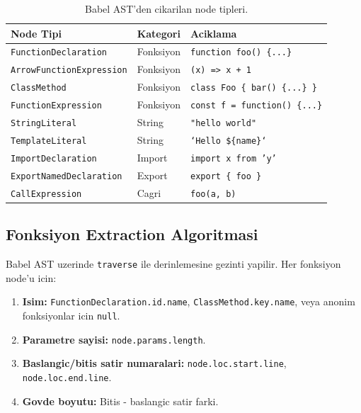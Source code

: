 \begin{table}[htbp]
\centering
\begin{tabular}{llp{5.5cm}}
\toprule
\textbf{\color{sectioncyan}Node Tipi} & \textbf{\color{sectioncyan}Kategori} & \textbf{\color{sectioncyan}Aciklama} \\
\midrule
\texttt{FunctionDeclaration}   & Fonksiyon & \texttt{function foo() \{...\}} \\
\texttt{ArrowFunctionExpression} & Fonksiyon & \texttt{(x) => x + 1} \\
\texttt{ClassMethod}           & Fonksiyon & \texttt{class Foo \{ bar() \{...\} \}} \\
\texttt{FunctionExpression}    & Fonksiyon & \texttt{const f = function() \{...\}} \\
\texttt{StringLiteral}         & String    & \texttt{"hello world"} \\
\texttt{TemplateLiteral}       & String    & \texttt{`Hello \$\{name\}`} \\
\texttt{ImportDeclaration}     & Import    & \texttt{import x from 'y'} \\
\texttt{ExportNamedDeclaration} & Export   & \texttt{export \{ foo \}} \\
\texttt{CallExpression}        & Cagri     & \texttt{foo(a, b)} \\
\bottomrule
\end{tabular}
\caption{Babel AST'den cikarilan node tipleri.}
\label{tab:ast-nodes}
\end{table}

\subsection{Fonksiyon Extraction Algoritmasi}

Babel AST uzerinde \texttt{traverse} ile derinlemesine gezinti yapilir. Her fonksiyon node'u icin:

\begin{enumerate}
\item \textbf{Isim:} \texttt{FunctionDeclaration.id.name}, \texttt{ClassMethod.key.name}, veya anonim fonksiyonlar icin \texttt{null}.
\item \textbf{Parametre sayisi:} \texttt{node.params.length}.
\item \textbf{Baslangic/bitis satir numaralari:} \texttt{node.loc.start.line}, \texttt{node.loc.end.line}.
\item \textbf{Govde boyutu:} Bitis - baslangic satir farki.
\end{enumerate}

